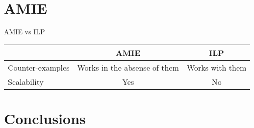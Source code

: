 \documentclass{beamer}
\begin{document}


\section{AMIE}
\begin{frame}{AMIE vs ILP}
    
    \begin{tabular}{ l | c | c }
        \toprule
        & AMIE & ILP \\
        \midrule
        Counter-examples & Works in the absense of them & Works with them \\
        Scalability      & Yes  & No\\
        \bottomrule
    \end{tabular}

\end{frame}

\section{Conclusions}
\end{document}
